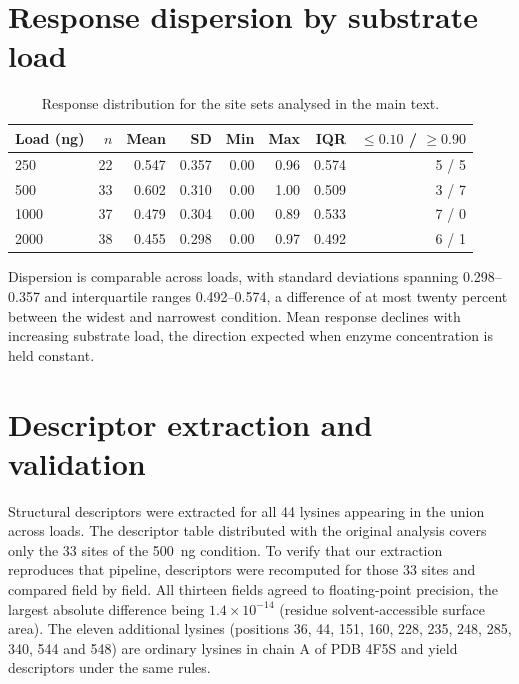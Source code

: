 \documentclass[journal=jprobs,manuscript=suppinfo,layout=traditional]{achemso}
\begin{document}
\section{Response dispersion by substrate load}

\begin{table}[htbp]
\caption{Response distribution for the site sets analysed in the main text.}
\label{tbl:s1}
\begin{tabular}{lrrrrrrr}
\toprule
Load (ng) & $n$ & Mean & SD & Min & Max & IQR & $\le 0.10$ / $\ge 0.90$ \\
\midrule
250  & 22 & 0.547 & 0.357 & 0.00 & 0.96 & 0.574 & 5 / 5 \\
500  & 33 & 0.602 & 0.310 & 0.00 & 1.00 & 0.509 & 3 / 7 \\
1000 & 37 & 0.479 & 0.304 & 0.00 & 0.89 & 0.533 & 7 / 0 \\
2000 & 38 & 0.455 & 0.298 & 0.00 & 0.97 & 0.492 & 6 / 1 \\
\bottomrule
\end{tabular}
\end{table}

Dispersion is comparable across loads, with standard deviations spanning
0.298--0.357 and interquartile ranges 0.492--0.574, a difference of at most
twenty percent between the widest and narrowest condition. Mean response
declines with increasing substrate load, the direction expected when enzyme
concentration is held constant.

\section{Descriptor extraction and validation}

Structural descriptors were extracted for all 44 lysines appearing in the union
across loads. The descriptor table distributed with the original analysis covers
only the 33 sites of the 500~ng condition. To verify that our extraction
reproduces that pipeline, descriptors were recomputed for those 33 sites and
compared field by field. All thirteen fields agreed to floating-point precision,
the largest absolute difference being $1.4\times10^{-14}$ (residue
solvent-accessible surface area). The eleven additional lysines (positions 36,
44, 151, 160, 228, 235, 248, 285, 340, 544 and 548) are ordinary lysines in
chain A of PDB 4F5S and yield descriptors under the same rules.
\end{document}
